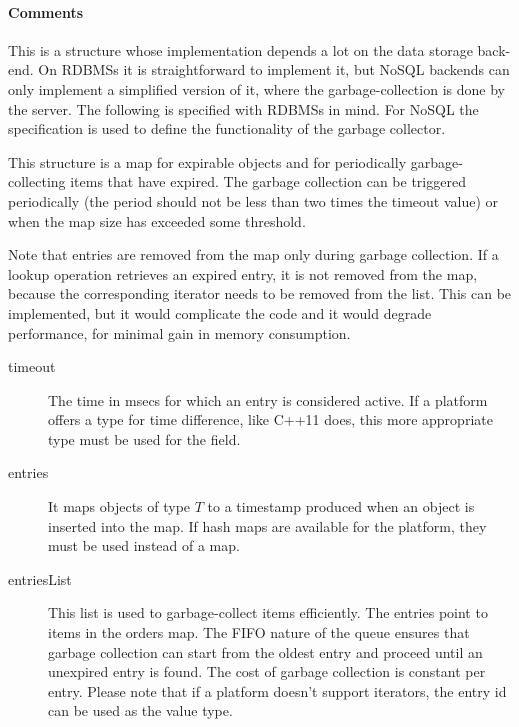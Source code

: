 \documentclass[a4paper,10pt]{article}
\begin{document}
\begin{inparaitem}[ ]
 \item \infrastructure
\end{inparaitem}

\paragraph*{Comments}
This is a structure whose implementation depends a lot on the data storage back-end. On RDBMSs it is straightforward to implement it, but NoSQL backends can only implement a 
simplified version of it, where the garbage-collection is done by the server. The following is specified with RDBMSs in mind. For NoSQL the specification is used to define the 
functionality of the garbage collector.

This structure is a map for expirable objects and for periodically garbage-collecting items that have expired. The garbage collection can be triggered periodically (the period 
should not be less than two times the timeout value) or when the map size has exceeded some threshold.

Note that entries are removed from the map only during garbage collection. If a lookup operation retrieves an expired entry, it is not removed from the map, because the 
corresponding iterator needs to be removed from the list. This can be implemented, but it would complicate the code and it would degrade performance, for minimal gain in memory 
consumption.

\SpecialItem
\begin{description}
 \item[timeout] The time in msecs for which an entry is considered active. If a platform offers a type for time difference, like C++11 does, this more appropriate type must be 
used for the field.
 \item[entries] It maps objects of type $T$ to a timestamp produced when an object is inserted into the map. If hash maps are available for the platform, they must be used instead 
of a map.
 \item[entriesList] This list is used to garbage-collect items efficiently. The entries point to items in the orders map. The FIFO nature of the queue ensures that garbage 
collection can start from the oldest entry and proceed until an unexpired entry is found. The cost of garbage collection is constant per entry. Please note that if a platform 
doesn't support iterators, the entry id can be used as the value type.
\end{description}
\end{document}
